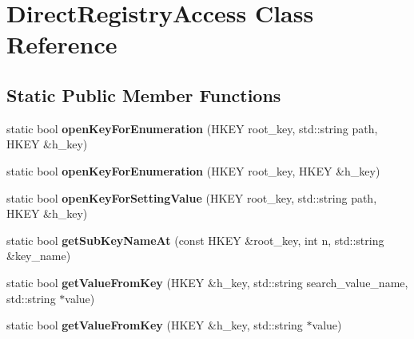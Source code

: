 \hypertarget{class_direct_registry_access}{}\section{Direct\+Registry\+Access Class Reference}
\label{class_direct_registry_access}
\subsection*{Static Public Member Functions}
\begin{DoxyCompactItemize}
\item 
\hypertarget{class_direct_registry_access_ae051be8724359399dacc86a38149762c}{}static bool {\bfseries open\+Key\+For\+Enumeration} (H\+K\+E\+Y root\+\_\+key, std\+::string path, H\+K\+E\+Y \&h\+\_\+key)\label{class_direct_registry_access_ae051be8724359399dacc86a38149762c}

\item 
\hypertarget{class_direct_registry_access_affd3141655ca0d587461282fcab5cc25}{}static bool {\bfseries open\+Key\+For\+Enumeration} (H\+K\+E\+Y root\+\_\+key, H\+K\+E\+Y \&h\+\_\+key)\label{class_direct_registry_access_affd3141655ca0d587461282fcab5cc25}

\item 
\hypertarget{class_direct_registry_access_a3bef2793ed202b4ba02ad9e099785485}{}static bool {\bfseries open\+Key\+For\+Setting\+Value} (H\+K\+E\+Y root\+\_\+key, std\+::string path, H\+K\+E\+Y \&h\+\_\+key)\label{class_direct_registry_access_a3bef2793ed202b4ba02ad9e099785485}

\item 
\hypertarget{class_direct_registry_access_aa123bf857d78ceb45ef406535869c6b1}{}static bool {\bfseries get\+Sub\+Key\+Name\+At} (const H\+K\+E\+Y \&root\+\_\+key, int n, std\+::string \&key\+\_\+name)\label{class_direct_registry_access_aa123bf857d78ceb45ef406535869c6b1}

\item 
\hypertarget{class_direct_registry_access_a0c4addcf0e776cdecead314ef7427f73}{}static bool {\bfseries get\+Value\+From\+Key} (H\+K\+E\+Y \&h\+\_\+key, std\+::string search\+\_\+value\+\_\+name, std\+::string $\ast$value)\label{class_direct_registry_access_a0c4addcf0e776cdecead314ef7427f73}

\item 
\hypertarget{class_direct_registry_access_a47b88eff5dfae4e37ca98b26d62dd12a}{}static bool {\bfseries get\+Value\+From\+Key} (H\+K\+E\+Y \&h\+\_\+key, std\+::string $\ast$value)\label{class_direct_registry_access_a47b88eff5dfae4e37ca98b26d62dd12a}


\end{DoxyCompactItemize}
